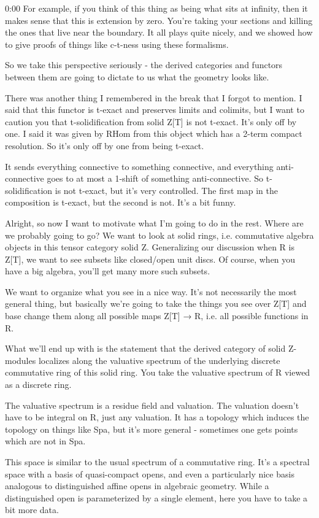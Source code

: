 \begin{unfinished}{0:00}
For example, if you think of this thing as being what sits at infinity, then it makes sense that this is extension by zero. You're taking your sections and killing the ones that live near the boundary. It all plays quite nicely, and we showed how to give proofs of things like c-t-ness using these formalisms.

So we take this perspective seriously - the derived categories and functors between them are going to dictate to us what the geometry looks like.

There was another thing I remembered in the break that I forgot to mention. I said that this functor is t-exact and preserves limits and colimits, but I want to caution you that t-solidification from solid Z[T] is not t-exact. It's only off by one. I said it was given by RHom from this object which has a 2-term compact resolution. So it's only off by one from being t-exact.

It sends everything connective to something connective, and everything anti-connective goes to at most a 1-shift of something anti-connective. So t-solidification is not t-exact, but it's very controlled. The first map in the composition is t-exact, but the second is not. It's a bit funny.

Alright, so now I want to motivate what I'm going to do in the rest. Where are we probably going to go? We want to look at solid rings, i.e. commutative algebra objects in this tensor category solid Z. Generalizing our discussion when R is Z[T], we want to see subsets like closed/open unit discs. Of course, when you have a big algebra, you'll get many more such subsets.

We want to organize what you see in a nice way. It's not necessarily the most general thing, but basically we're going to take the things you see over Z[T] and base change them along all possible maps Z[T] → R, i.e. all possible functions in R.

What we'll end up with is the statement that the derived category of solid Z-modules localizes along the valuative spectrum of the underlying discrete commutative ring of this solid ring. You take the valuative spectrum of R viewed as a discrete ring.

The valuative spectrum is a residue field and valuation. The valuation doesn't have to be integral on R, just any valuation. It has a topology which induces the topology on things like Spa, but it's more general - sometimes one gets points which are not in Spa.

This space is similar to the usual spectrum of a commutative ring. It's a spectral space with a basis of quasi-compact opens, and even a particularly nice basis analogous to distinguished affine opens in algebraic geometry. While a distinguished open is parameterized by a single element, here you have to take a bit more data.


\end{unfinished}
